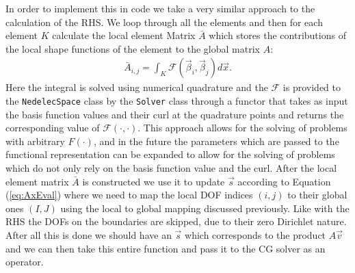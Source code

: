 In order to implement this in code we take a very similar approach to the calculation of the RHS. We loop through all the elements and then for each element \(K\) calculate the local element Matrix $\bar{A}$ which stores the contributions of the local shape functions of the element to the global matrix \(A\):
\begin{align}
    \bar{A}_{i,j} = \int_K \mathcal{F}(\vec\beta_i, \vec\beta_j) d\vec{x} \text{.}
\end{align}
Here the integral is solved using numerical quadrature and the $\mathcal{F}$ is provided to the \texttt{NedelecSpace} class by the \texttt{Solver} class through a functor that takes as input the basis function values and their curl at the quadrature points and returns the corresponding value of $\mathcal{F}(\cdot, \cdot)$. This approach allows for the solving of problems with arbitrary $F(\cdot)$, and in the future the parameters which are passed to the functional representation can be expanded to allow for the solving of problems which do not only rely on the basis function value and the curl. After the local element matrix $\bar{A}$ is constructed we use it to update $\vec{s}$ according to Equation (\ref{eq:AxEval}) where we need to map the local DOF indices $(i,j)$ to their global ones $(I,J)$ using the local to global mapping discussed previously. Like with the RHS the DOFs on the boundaries are skipped, due to their zero Dirichlet nature. After all this is done we should have an $\vec{s}$ which corresponds to the product $A\vec{v}$ and we can then take this entire function and pass it to the CG solver as an operator.


